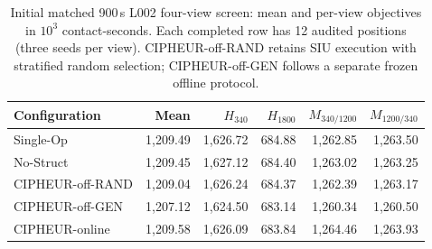 \begin{table}[t]
\centering
\scriptsize
\setlength{\tabcolsep}{2.5pt}
\caption{Initial matched 900\,s L002 four-view screen: mean and per-view objectives in $10^3$ contact-seconds. Each completed row has 12 audited positions (three seeds per view). CIPHEUR-off-RAND retains SIU execution with stratified random selection; CIPHEUR-off-GEN follows a separate frozen offline protocol.}
\label{tab:siu-ablation-screen}
\begin{tabular}{@{}lrrrrr@{}}
\toprule
Configuration & Mean & $H_{340}$ & $H_{1800}$ & $M_{340/1200}$ & $M_{1200/340}$ \\
\midrule
Single-Op & 1,209.49 & 1,626.72 & 684.88 & 1,262.85 & 1,263.50 \\
No-Struct & 1,209.45 & 1,627.12 & 684.40 & 1,263.02 & 1,263.25 \\
CIPHEUR-off-RAND & 1,209.04 & 1,626.24 & 684.37 & 1,262.39 & 1,263.17 \\
CIPHEUR-off-GEN & 1,207.12 & 1,624.50 & 683.14 & 1,260.34 & 1,260.50 \\
CIPHEUR-online & 1,209.58 & 1,626.09 & 683.84 & 1,264.46 & 1,263.93 \\
\bottomrule
\end{tabular}
\end{table}
